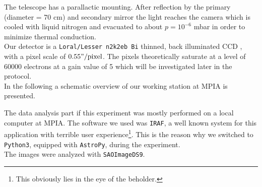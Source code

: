 The telescope has a parallactic mounting. After reflection by the primary (diameter = 70 cm) and secondary mirror the light reaches the camera which is cooled with liquid nitrogen and evacuated to about $p = 10^{-6}$ mbar in order to minimize thermal conduction.  \\
Our detector is a \texttt{Loral/Lesser n2k2eb Bi} thinned, back illuminated CCD , with a pixel scale of $0.55"/\text{pixel}$. The pixels theoretically saturate at a level of 60000 electrons at a gain value of 5 which will be investigated later in the protocol.\\
In the following a schematic overview of our working station at MPIA is presented.

The data analysis part if this experiment was mostly performed on a local computer at MPIA. 
The software we used was \texttt{IRAF}, a well known system for this application with terrible user experience\footnote{This obviously lies in the eye of the beholder.}. This is the reason why we switched to \texttt{Python3}, equipped with \texttt{AstroPy}, during the experiment. \\
The images were analyzed with \texttt{SAOImageDS9}.